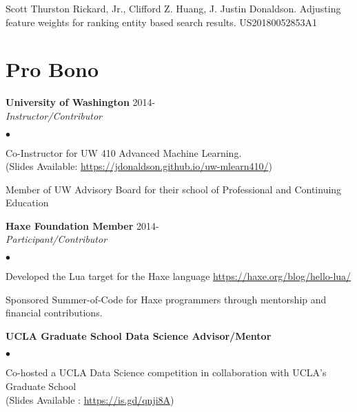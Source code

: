 \documentclass[margin,line]{res}
\newenvironment{list2}{
  \begin{list}{$\bullet$}{%
      \setlength{\itemsep}{0in}
      \setlength{\parsep}{0in} \setlength{\parskip}{0in}
      \setlength{\topsep}{0in} \setlength{\partopsep}{0in} 
      \setlength{\leftmargin}{0.2in}}}{\end{list}}
\begin{document}
\begin{resume}
Scott Thurston Rickard, Jr., Clifford Z. Huang, J. Justin Donaldson. Adjusting feature weights for ranking entity based search results. US20180052853A1


\section{\sc Pro Bono}

{\bf University of Washington} \hfill 2014- \\
{\em Instructor/Contributor}
\begin{list2}
  \item Co-Instructor for UW 410 Advanced Machine Learning.\\ (Slides Available: \url{https://jdonaldson.github.io/uw-mlearn410/})
  \item Member of UW Advisory Board for their school of Professional and Continuing Education
\end{list2}

{\bf Haxe Foundation Member} \hfill 2014- \\
{\em Participant/Contributor} 

\begin{list2}
  \item Developed the Lua target for the Haxe language \url{https://haxe.org/blog/hello-lua/}
  \item Sponsored Summer-of-Code for Haxe programmers through mentorship and financial contributions.
\end{list2}


{\bf UCLA Graduate School Data Science Advisor/Mentor}
\begin{list2}
  \item Co-hosted a UCLA Data Science competition in collaboration with UCLA's Graduate School \\ (Slides Available : \url{https://is.gd/qnji8A})
\end{list2}






%

\end{resume}
\end{document}
